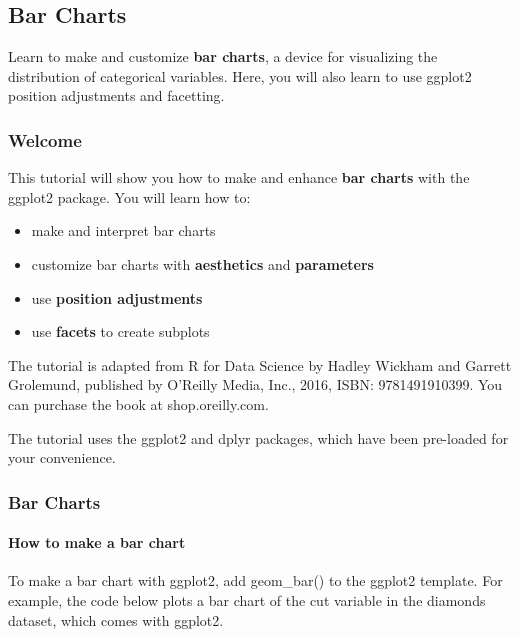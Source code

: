 \documentclass[
]{article}
\providecommand{\tightlist}{%
  \setlength{\itemsep}{0pt}\setlength{\parskip}{0pt}}
\begin{document}
\hypertarget{bar-charts}{%
\subsection{Bar Charts}\label{bar-charts}}

Learn to make and customize \textbf{bar charts}, a device for
visualizing the distribution of categorical variables. Here, you will
also learn to use ggplot2 position adjustments and facetting.

\hypertarget{welcome-6}{%
\subsubsection{Welcome}\label{welcome-6}}

This tutorial will show you how to make and enhance \textbf{bar charts}
with the ggplot2 package. You will learn how to:

\begin{itemize}
\tightlist
\item
  make and interpret bar charts
\item
  customize bar charts with \textbf{aesthetics} and \textbf{parameters}
\item
  use \textbf{position adjustments}
\item
  use \textbf{facets} to create subplots
\end{itemize}

The tutorial is adapted from R for Data Science by Hadley Wickham and
Garrett Grolemund, published by O'Reilly Media, Inc., 2016, ISBN:
9781491910399. You can purchase the book at shop.oreilly.com.

The tutorial uses the ggplot2 and dplyr packages, which have been
pre-loaded for your convenience.

\hypertarget{bar-charts-1}{%
\subsubsection{Bar Charts}\label{bar-charts-1}}

\hypertarget{how-to-make-a-bar-chart}{%
\paragraph{How to make a bar chart}\label{how-to-make-a-bar-chart}}

To make a bar chart with ggplot2, add geom\_bar() to the ggplot2
template. For example, the code below plots a bar chart of the cut
variable in the diamonds dataset, which comes with ggplot2.
\end{document}
